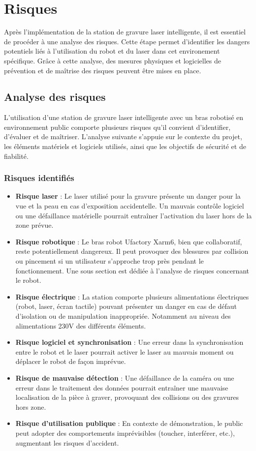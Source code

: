 \chapter{Risques}
\label{chap:risques}

Après l'implémentation de la station de gravure laser intelligente, il est essentiel de procéder à une analyse des risques. Cette étape permet d'identifier les dangers potentiels liés à l'utilisation du robot et du laser dans cet environement spécifique. Grâce à cette analyse, des mesures physiques et logicielles de prévention et de maîtrise des risques peuvent être mises en place.

\section{Analyse des risques}
L'utilisation d'une station de gravure laser intelligente avec un bras robotisé en environnement public comporte plusieurs risques qu'il convient d'identifier, d'évaluer et de maîtriser. L'analyse suivante s'appuie sur le contexte du projet, les éléments matériels et logiciels utilisés, ainsi que les objectifs de sécurité et de fiabilité.

\subsection{Risques identifiés}
\begin{itemize}
    \item \textbf{Risque laser} : Le laser utilisé pour la gravure présente un danger pour la vue et la peau en cas d'exposition accidentelle. Un mauvais contrôle logiciel ou une défaillance matérielle pourrait entraîner l'activation du laser hors de la zone prévue.
    \item \textbf{Risque robotique} : Le bras robot Ufactory Xarm6, bien que collaboratif, reste potentiellement dangereux. Il peut provoquer des blessures par collision ou pincement si un utilisateur s'approche trop près pendant le fonctionnement. Une sous section est dédiée à l'analyse de risques concernant le robot.
    \item \textbf{Risque électrique} : La station comporte plusieurs alimentations électriques (robot, laser, écran tactile) pouvant présenter un danger en cas de défaut d'isolation ou de manipulation inappropriée. Notamment au niveau des alimentations 230V des différents éléments.
    \item \textbf{Risque logiciel et synchronisation} : Une erreur dans la synchronisation entre le robot et le laser pourrait activer le laser au mauvais moment ou déplacer le robot de façon imprévue.
    \item \textbf{Risque de mauvaise détection} : Une défaillance de la caméra ou une erreur dans le traitement des données pourrait entraîner une mauvaise localisation de la pièce à graver, provoquant des collisions ou des gravures hors zone.
    \item \textbf{Risque d'utilisation publique} : En contexte de démonstration, le public peut adopter des comportements imprévisibles (toucher, interférer, etc.), augmentant les risques d'accident.
\end{itemize}

